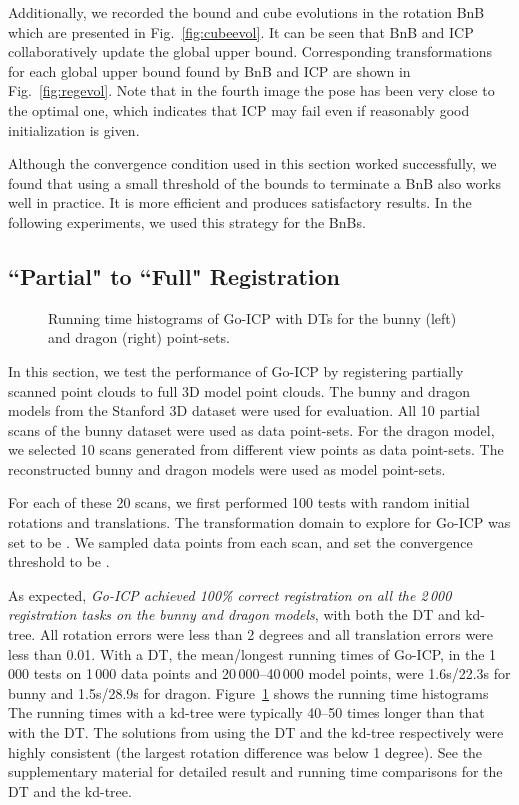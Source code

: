 \documentclass[10pt,journal,cspaper,compsoc]{IEEEtran}
\begin{document}
Additionally, we recorded the bound and cube evolutions in the rotation BnB which are presented in Fig.~\ref{fig:cubeevol}. It can be seen that BnB and ICP collaboratively update the global upper bound. Corresponding transformations for each global upper bound found by BnB and ICP are shown in Fig.~\ref{fig:regevol}. Note that in the fourth image the pose has been very close to the optimal one, which indicates that ICP may fail even if reasonably good initialization is given.

Although the convergence condition used in this section worked successfully, we found that using a small threshold  of the bounds to terminate a BnB also works well in practice. It is more efficient and produces satisfactory results. In the following experiments, we used this strategy for the BnBs.

\subsection{``Partial" to ``Full" Registration}\label{sec:p2f}
\begin{figure}[!t]
\begin{center}
\vspace{-10pt}
\caption{Running time histograms of Go-ICP with DTs for the bunny (left) and dragon (right) point-sets.
\label{fig:time_pose}}
\end{center}
\vspace{-9pt}
\end{figure}

In this section, we test the performance of Go-ICP by registering partially scanned point clouds to full 3D model point clouds. The bunny and dragon models from the Stanford 3D dataset were used for evaluation. All 10 partial scans of the bunny dataset were used as data point-sets. For the dragon model, we selected 10 scans generated from different view points as data point-sets. The reconstructed bunny and dragon models were used as model point-sets.

For each of these 20 scans, we first performed 100 tests with random initial rotations and translations. The transformation domain to explore for Go-ICP was set to be . We sampled  data points from each scan, and set the convergence threshold  to be .

As expected, \emph{Go-ICP achieved 100\% correct registration on all the 2\,000 registration tasks on the bunny and dragon models}, with both the DT and kd-tree. All rotation errors were less than 2 degrees and all translation errors were less than 0.01. With a DT, the mean/longest running times of Go-ICP, in the 1\,000 tests on 1\,000 data points and 20\,000--40\,000 model points, were 1.6s/22.3s for bunny and 1.5s/28.9s for dragon. Figure~\ref{fig:time_pose} shows the running time histograms The running times with a kd-tree were typically 40--50 times longer than that with the DT. The solutions from using the DT and the kd-tree respectively were highly consistent (the largest rotation difference was below 1 degree). See the supplementary material for detailed result and running time comparisons for the DT and the kd-tree.
\end{document}
